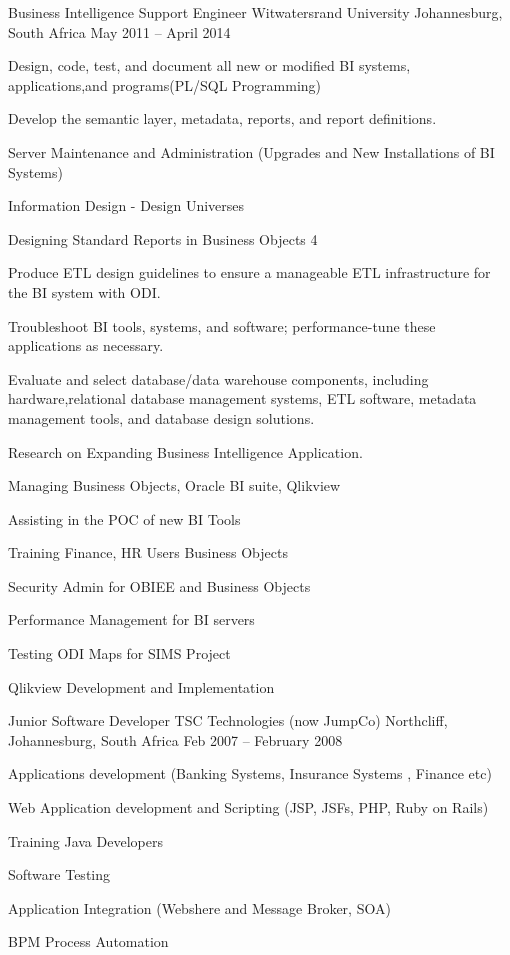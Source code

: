 \begin{cventries}
\cventry
{Business Intelligence Support Engineer} %
{Witwatersrand University} %
{Johannesburg, South Africa} %
{May 2011 -- April 2014} %
{ %
\begin{cvitems}
	   \item Design, code, test, and document all new or modified BI systems, applications,and programs(PL/SQL Programming)
	   \item Develop the semantic layer, metadata, reports, and report definitions.
	   \item Server Maintenance and Administration (Upgrades and New Installations of BI Systems)
	   \item Information Design - Design Universes
	   \item Designing Standard Reports in Business Objects 4
	   \item Produce ETL design guidelines to ensure a manageable ETL infrastructure for the BI system with ODI.
	   \item Troubleshoot BI tools, systems, and software; performance-tune these applications as necessary.
	   \item Evaluate and select database/data warehouse components, including hardware,relational database management systems, ETL software, metadata management tools, and database design solutions.
	   \item Research on Expanding Business Intelligence Application.
	   \item Managing Business Objects, Oracle BI suite, Qlikview
	   \item Assisting in the POC of new BI Tools
	   \item Training Finance, HR Users Business Objects
	   \item Security Admin for OBIEE and Business Objects
	   \item Performance Management for BI servers
	   \item Testing ODI Maps for SIMS Project
	   \item Qlikview Development and Implementation
\end{cvitems}
}


\cventry
{Junior Software Developer} %
{TSC Technologies (now JumpCo)} %
{Northcliff, Johannesburg, South Africa} %
{Feb 2007 -- February 2008} %
{ %
\begin{cvitems}
  \item Applications development (Banking Systems, Insurance Systems , Finance etc)
  \item Web Application development and Scripting (JSP, JSFs, PHP, Ruby on Rails)
  \item Training Java Developers
  \item Software Testing
  \item Application Integration (Webshere and Message Broker, SOA)
  \item BPM Process Automation
\end{cvitems} 
}



\end{cventries}